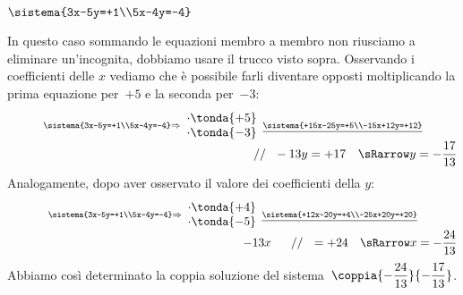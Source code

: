 \begin{esempio}{}{}
\(\sistema{3x-5y=+1\\5x-4y=-4}\)

In questo caso sommando le equazioni membro a membro non riusciamo a 
eliminare un'incognita, dobbiamo usare il trucco visto sopra.
Osservando i coefficienti delle \(x\) vediamo che è possibile farli 
diventare opposti moltiplicando la prima equazione per~\(+5\) e la 
seconda per~\(-3\):
\[\stackrel{\sistema{3x-5y=+1\\5x-4y=-4}\Rightarrow
  \begin{array}{l}\cdot \tonda{+5}\\ \cdot \tonda{-3}\end{array}
  \underline{\sistema{+15x-25y=+5\\-15x+12y=+12}}}
  {\qquad \qquad \qquad \qquad \qquad \qquad \qquad \qquad \qquad \qquad 
   // ~~ -13y  =+17 \quad \sRarrow y=-\frac{17}{13}}\]
Analogamente, dopo aver osservato il valore dei coefficienti della \(y\):
\[\stackrel{\sistema{3x-5y=+1\\5x-4y=-4}\Rightarrow
  \begin{array}{l}\cdot \tonda{+4}\\ \cdot \tonda{-5}\end{array}
  \underline{\sistema{+12x-20y=+4\\-25x+20y=+20}}}
  {\qquad \qquad \qquad \qquad \qquad \qquad \qquad \qquad \qquad 
   ~~~~~ -13x ~~~~~ // ~~ =+24 \quad \sRarrow x=-\frac{24}{13}}\]
Abbiamo così determinato la coppia soluzione del 
sistema~\(\coppia{-\dfrac{24}{13}}{-\dfrac{17}{13}}\).

 \end{esempio}

